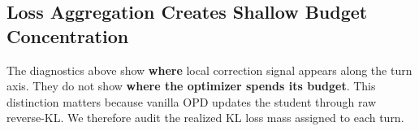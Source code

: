 


\subsection{Loss Aggregation Creates Shallow Budget Concentration}
\label{sec:diag:turnnorm}

The diagnostics above show \textbf{where} local correction signal appears along
the turn axis. They do not show \textbf{where the optimizer spends its budget}.
This distinction matters because vanilla OPD updates the student through raw
reverse-KL. We therefore audit the realized KL loss mass assigned to each turn.

